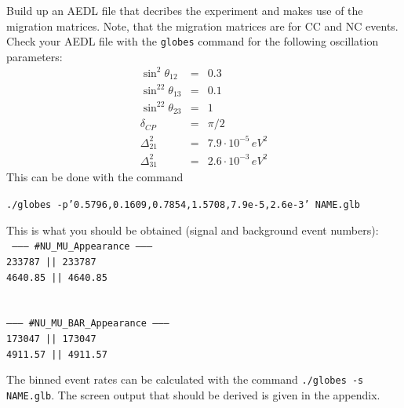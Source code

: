 \documentclass[12pt,a4paper]{article}
\theoremstyle{dotless}
\begin{document}
Build up an AEDL file that decribes the experiment and makes use of the migration matrices.
Note, that the migration matrices are for CC and NC events. \\

Check your AEDL file with the {\tt globes} command for the following oscillation parameters:
\begin{eqnarray}
\sin^2\theta_{12} & = & 0.3 \nonumber \\
\sin^22\theta_{13} & = & 0.1  \nonumber \\
\sin^22\theta_{23} & = & 1  \nonumber \\
\delta_{CP} & = & \pi/2  \nonumber \\
\Delta^2_{21} & = & 7.9\cdot 10^{-5}\, eV^2  \nonumber \\
\Delta^2_{31} & = & 2.6\cdot 10^{-3}\, eV^2  
\end{eqnarray}
This can be done with the command 
\begin{center}
{\tt ./globes -p'0.5796,0.1609,0.7854,1.5708,7.9e-5,2.6e-3' NAME.glb}
\end{center}

This is what you should be obtained (signal and background event numbers):\\

{\tt 
\hspace*{2cm} --------- \#NU\_MU\_Appearance ---------\\
\hspace*{2cm}               233787 ||       233787\\
\hspace*{2cm}              4640.85 ||      4640.85\\
\hspace*{2cm} \\
\hspace*{2cm} \\
\hspace*{2cm} --------- \#NU\_MU\_BAR\_Appearance ---------\\
\hspace*{2cm}               173047 ||       173047\\
\hspace*{2cm}              4911.57 ||      4911.57\\
}

The binned event rates can be calculated with the command {\tt ./globes -s NAME.glb}. The screen output that should be
derived is given in the appendix.  \\
\end{document}
